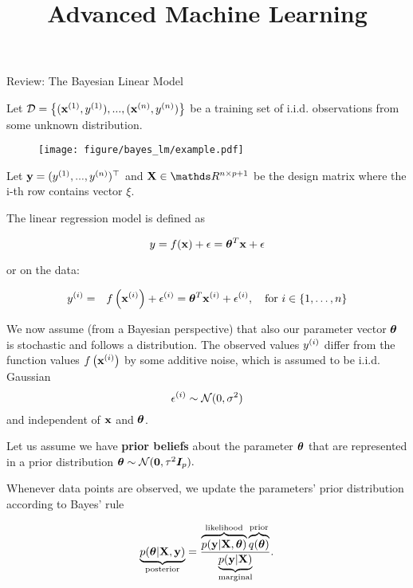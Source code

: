 \documentclass[11pt,compress,t,notes=noshow, xcolor=table]{beamer}
\title{Advanced Machine Learning}
\date{}
\begin{document}


\begin{vbframe}{Review: The Bayesian Linear Model}

    Let $\D = \left\{(\xi[1], \yi[1]), ..., (\xi[n], \yi[n])\right\}$ be a training set of i.i.d. observations from some unknown distribution.

    \begin{figure}
      \texttt{[image: figure/bayes\_lm/example.pdf]}
    \end{figure}

    Let $\yv = (\yi[1], ..., \yi[n])^\top$ and $\Xmat \in \R^{n \times p+1}$ be the design matrix where the i-th row contains vector $\xi$.  
    
    \framebreak

    The linear regression model is defined as

    $$
    y = \fx + \epsilon = \thetav^T \xv + \epsilon 
    $$

    or on the data:

    \begin{eqnarray*}
    \yi &=& \fxi + \epsi = \thetav^T \xi + \epsi, \quad \text{for } i \in \{1, \ldots, n\}
    \end{eqnarray*}
    

    We now assume (from a Bayesian perspective) that also our parameter vector $\thetav$ is stochastic and follows a distribution.
    The observed values $\yi$ differ from the function values $\fxi$ by some additive noise, which is assumed to be i.i.d. Gaussian 
    $$
    \epsi \sim \mathcal{N}(0, \sigma^2)$$
    and independent of $\xv$ and $\thetav$.

    \framebreak

    Let us assume we have \textbf{prior beliefs} about the parameter $\thetav$ that are represented in a prior distribution $\thetav \sim \mathcal{N}(\zero, \tau^2 \id_p).$

    \lz 

    Whenever data points are observed, we update the parameters' prior distribution according to Bayes' rule 

    $$
    \underbrace{p(\thetav | \Xmat, \yv)}_{\text{posterior}} = \frac{\overbrace{p(\yv | \Xmat, \thetav)}^{\text{likelihood}}\overbrace{q(\thetav)}^{\text{prior}}}{\underbrace{p(\yv|\Xmat)}_{\text{marginal}}}. 
    $$

    \framebreak 


\end{vbframe}
\end{document}
